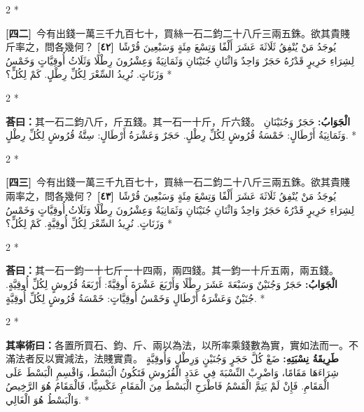 \documentclass[11pt,a4paper]{article}
\newcommand{\ar}[1]{\arabicfont\beginR #1\endR}
\newcommand{\problemnum}[1]{\textbf{[\ignorespaces#1\unskip]}}
\newenvironment{bilingual}{%
  \begin{paracol}{2}%
  \switchcolumn[0]*%
}{%
  \end{paracol}%
}
\newcommand{\cnline}[1]{\switchcolumn[0]\noindent #1 \switchcolumn[1]}
\newcommand{\arline}[1]{\noindent\ar{#1} \switchcolumn[0]*}
\newenvironment{prob bilingual}{%
  \begin{paracol}{2}%
  \switchcolumn[0]*%
}{%
  \end{paracol}%
  \vspace{0.3em}%
}
\begin{document}
\begin{bilingual}
\cnline{\problemnum{四二}\, 今有出錢一萬三千九百七十，買絲一石二鈞二十八斤三兩五銖。欲其貴賤斤率之，問各幾何？}
\arline{\problemnum{٤٢}\, يُوجَدُ مَنْ يُنْفِقُ ثَلَاثَةَ عَشَرَ أَلْفًا وَتِسْعَ مِئَةٍ وَسَبْعِينَ قُرْشًا لِشِرَاءِ حَرِيرٍ قَدْرُهُ حَجَرٌ وَاحِدٌ وَاثْنَانِ جُنَيْنَانِ وَثَمَانِيَةٌ وَعِشْرُونَ رِطْلًا وَثَلَاثُ أُوقِيَّاتٍ وَخَمْسُ وَزَنَاتٍ. نُرِيدُ السِّعْرَ لِكُلِّ رِطْلٍ. كَمْ لِكُلٍّ؟}
\end{bilingual}

\begin{bilingual}
\cnline{\textcolor{answercolor}{\textbf{荅曰：}}其一石二鈞八斤，斤五錢。其一石一十斤，斤六錢。}
\arline{\textcolor{answercolor}{\textbf{الْجَوَابُ:}} حَجَرٌ وَجُنَيْنَانِ وَثَمَانِيَةُ أَرْطَالٍ: خَمْسَةُ قُرُوشٍ لِكُلِّ رِطْلٍ. حَجَرٌ وَعَشْرَةُ أَرْطَالٍ: سِتَّةُ قُرُوشٍ لِكُلِّ رِطْلٍ.}
\end{bilingual}

\begin{bilingual}
\cnline{\problemnum{四三}\, 今有出錢一萬三千九百七十，買絲一石二鈞二十八斤三兩五銖。欲其貴賤兩率之，問各幾何？}
\arline{\problemnum{٤٣}\, يُوجَدُ مَنْ يُنْفِقُ ثَلَاثَةَ عَشَرَ أَلْفًا وَتِسْعَ مِئَةٍ وَسَبْعِينَ قُرْشًا لِشِرَاءِ حَرِيرٍ قَدْرُهُ حَجَرٌ وَاحِدٌ وَاثْنَانِ جُنَيْنَانِ وَثَمَانِيَةٌ وَعِشْرُونَ رِطْلًا وَثَلَاثُ أُوقِيَّاتٍ وَخَمْسُ وَزَنَاتٍ. نُرِيدُ السِّعْرَ لِكُلِّ أُوقِيَّةٍ. كَمْ لِكُلٍّ؟}
\end{bilingual}

\begin{bilingual}
\cnline{\textcolor{answercolor}{\textbf{荅曰：}}其一石一鈞一十七斤一十四兩，兩四錢。其一鈞一十斤五兩，兩五錢。}
\arline{\textcolor{answercolor}{\textbf{الْجَوَابُ:}} حَجَرٌ وَجُنَيْنٌ وَسَبْعَةَ عَشَرَ رِطْلًا وَأَرْبَعَ عَشْرَةَ أُوقِيَّةً: أَرْبَعَةُ قُرُوشٍ لِكُلِّ أُوقِيَّةٍ. جُنَيْنٌ وَعَشْرَةُ أَرْطَالٍ وَخَمْسُ أُوقِيَّاتٍ: خَمْسَةُ قُرُوشٍ لِكُلِّ أُوقِيَّةٍ.}
\end{bilingual}

\begin{bilingual}
\cnline{%
\textcolor{methodcolor}{\textbf{其率術曰：}}各置所買石、鈞、斤、兩以為法，以所率乘錢數為實，實如法而一。不滿法者反以實減法，法賤實貴。
}
\arline{%
\textcolor{methodcolor}{\textbf{طَرِيقَةُ نِسْبَتِهِ:}} ضَعْ كُلَّ حَجَرٍ وَجُنَيْنٍ وَرِطْلٍ وَأُوقِيَّةٍ شِرَاءَهَا مَقَامًا، وَاضْرِبْ النِّسْبَةَ فِي عَدَدِ الْقُرُوشِ فَتَكُونُ الْبَسْطَ، وَاقْسِمِ الْبَسْطَ عَلَى الْمَقَامِ. فَإِنْ لَمْ يَتِمَّ الْقَسْمُ فَاطْرَحِ الْبَسْطَ مِنَ الْمَقَامِ عَكْسِيًّا، فَالْمَقَامُ هُوَ الرَّخِيصُ وَالْبَسْطُ هُوَ الْغَالِي.
}
\end{bilingual}
\end{document}
